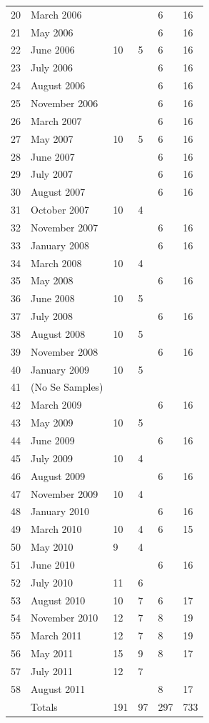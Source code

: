 \begin{linenumbers}
{\begin{longtable}{c C{1.25in} C{.9in} C{1in} C{.9in} C{1in}}
		20 & March 2006 &  &  & 6 & 16 \\
		21 & May 2006 &  &  & 6 & 16 \\
		22 & June 2006 & 10 & 5 & 6 & 16 \\
		23 & July 2006 &  &  & 6 & 16 \\
		24 & August 2006 &  &  & 6 & 16 \\
		25 & November 2006 &  &  & 6 & 16 \\
		26 & March 2007 &  &  & 6 & 16 \\
		27 & May 2007 & 10 & 5 & 6 & 16 \\
		28 & June 2007 &  &  & 6 & 16 \\
		29 & July 2007 &  &  & 6 & 16 \\
		30 & August 2007 &  &  & 6 & 16 \\
		31 & October 2007 & 10 & 4 &  &  \\
		32 & November 2007 &  &  & 6 & 16 \\
		33 & January 2008 &  &  & 6 & 16 \\
		34 & March 2008 & 10 & 4 &  &  \\
		35 & May 2008 &  &  & 6 & 16 \\
		36 & June 2008 & 10 & 5 &  &  \\
		37 & July 2008 &  &  & 6 & 16 \\
		38 & August 2008 & 10 & 5 &  &  \\
		39 & November 2008 &  &  & 6 & 16 \\
		40 & January 2009 & 10 & 5 &  &  \\
		41 & (No Se Samples) &  &  &  &  \\
		42 & March 2009 &  &  & 6 & 16 \\
		43 & May 2009 & 10 & 5 &  &  \\
		44 & June 2009 &  &  & 6 & 16 \\
		45 & July 2009 & 10 & 4 &  &  \\
		46 & August 2009 &  &  & 6 & 16 \\
		47 & November 2009 & 10 & 4 &  &  \\
		48 & January 2010 &  &  & 6 & 16 \\
		49 & March 2010 & 10 & 4 & 6 & 15 \\
		50 & May 2010 & 9 & 4 &  &  \\
		51 & June 2010 &  &  & 6 & 16 \\
		52 & July 2010 & 11 & 6 &  &  \\
		53 & August 2010 & 10 & 7 & 6 & 17 \\
		54 & November 2010 & 12 & 7 & 8 & 19 \\
		55 & March 2011 & 12 & 7 & 8 & 19 \\
		56 & May 2011 & 15 & 9 & 8 & 17 \\
		57 & July 2011 & 12 & 7 &  &  \\
		58 & August 2011 &  &  & 8 & 17 \\\morecmidrules{}
		& Totals & 191 & 97 & 297 & 733\\
	\end{longtable}%
	\renewcommand{\arraystretch}{1.95}
}


\end{linenumbers}
